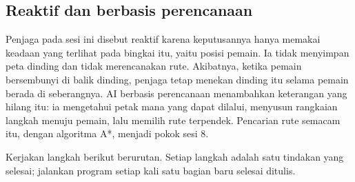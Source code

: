 \subsection*{Reaktif dan berbasis perencanaan}

Penjaga pada sesi ini disebut reaktif karena keputusannya hanya memakai keadaan
yang terlihat pada bingkai itu, yaitu posisi pemain. Ia tidak menyimpan peta
dinding dan tidak merencanakan rute. Akibatnya, ketika pemain bersembunyi di
balik dinding, penjaga tetap menekan dinding itu selama pemain berada di
seberangnya. AI berbasis perencanaan menambahkan keterangan yang hilang itu:
ia mengetahui petak mana yang dapat dilalui, menyusun rangkaian langkah menuju
pemain, lalu memilih rute terpendek. Pencarian rute semacam itu, dengan
algoritma A*, menjadi pokok sesi 8.


Kerjakan langkah berikut berurutan. Setiap langkah adalah satu tindakan yang
selesai; jalankan program setiap kali satu bagian baru selesai ditulis.

